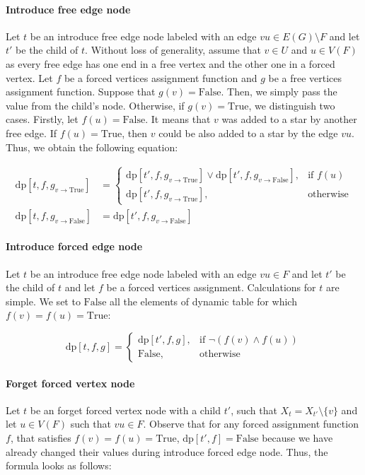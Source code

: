 \documentclass[en]{pracamgr}
\theoremstyle{definition}
\newcommand{\dpt}[1]{\textrm{dp}[#1]}
\newcommand{\true}{\textrm{True}}
\newcommand{\false}{\textrm{False}}
\begin{document}
\paragraph{Introduce free edge node} Let $t$ be an introduce free edge node labeled with an edge $vu \in E(G) \setminus F$ and let $t'$ be the child of $t$. Without loss of generality, assume that $v \in U$ and $u \in V(F)$ as every free edge has one end in a free vertex and the other one in a forced vertex. Let $f$ be a forced vertices assignment function and $g$ be a free vertices assignment function. Suppose that $g(v)=\false$. Then, we simply pass the value from the child's node. Otherwise, if $g(v)=\true$, we distinguish two cases. Firstly, let $f(u)=\false$. It means that $v$ was added to a star by another free edge. If $f(u)=\true$, then $v$ could be also added to a star by the edge $vu$. Thus, we obtain the following equation: 

\begin{equation*}
\begin{split}
	\dpt{t,f,g_{v \rightarrow \true}} & = 
		\begin{cases}
			\dpt{t',f,g_{v \rightarrow \true}} \lor \dpt{t',f,g_{v \rightarrow \false}}, & \text{if $f(u)$} \\
			\dpt{t',f,g_{v \rightarrow \true}}, & \text{otherwise}
		\end{cases}	
	\\
	\dpt{t,f,g_{v \rightarrow \false}} & = \dpt{t',f,g_{v \rightarrow \false}}\end{split}
\end{equation*}

\paragraph{Introduce forced edge node} Let $t$ be an introduce free edge node labeled with an edge $vu \in F$ and let $t'$ be the child of $t$ and let $f$ be a forced vertices assignment. Calculations for $t$ are simple. We set to $\false$ all the elements of dynamic table for which $f(v)=f(u)=\true$:

\begin{equation*}
	\dpt{t,f,g} =
	\begin{cases}
		\dpt{t',f,g}, & \text{if $\neg(f(v) \land f(u))$} \\
		\false, & \text{otherwise}
	\end{cases}
\end{equation*}

\paragraph{Forget forced vertex node} Let $t$ be an forget forced vertex node with a child $t'$, such that $X_t = X_{t'} \setminus \{v\}$ and let $u \in V(F)$ such that $vu \in F$. Observe that for any forced assignment function $f$, that satisfies $f(v)=f(u)=\true$, $\dpt{t',f} = \false$ because we have already changed their values during introduce forced edge node. Thus, the formula looks as follows:
\end{document}
